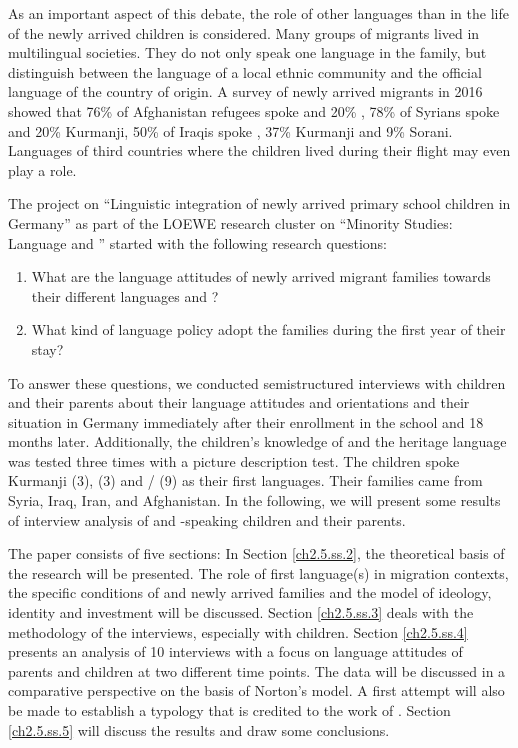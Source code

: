 \documentclass[output=paper,colorlinks,citecolor=brown]{langscibook}
\begin{document}
\largerpage
As an important aspect of this debate, the role of other languages than  in the life of the newly arrived children is considered. Many groups of migrants lived in multilingual societies. They do not only speak one language in the family, but distinguish between the language of a local ethnic community and the official language of the country of origin. A survey of newly arrived migrants in 2016 \citep{bruecker_rother_schupp2016} showed that 76\% of Afghanistan refugees spoke  and 20\% , 78\% of Syrians spoke  and 20\% Kurmanji, 50\% of Iraqis spoke , 37\% Kurmanji and 9\% Sorani. Languages of third countries where the children lived during their flight may even play a role.

The project on ``Linguistic integration of newly arrived primary school children in Germany'' as part of the LOEWE research cluster on ``Minority Studies: Language and '' started with the following research questions: 

\begin{enumerate}
    \item What are the language attitudes of newly arrived migrant families towards their different languages and ? 
    \item What kind of language policy adopt the families during the first year of their stay? 
\end{enumerate}

To answer these questions, we conducted semistructured interviews with children and their parents about their language attitudes and orientations and their situation in Germany immediately after their enrollment in the school and 18 months later. Additionally, the children's knowledge of  and the heritage language was tested three times with a picture description test. The children spoke Kurmanji  (3),  (3) and / (9) as their first languages. Their families came from Syria, Iraq, Iran, and Afghanistan. In the following, we will present some results of interview analysis of  and -speaking children and their parents.

The paper consists of five sections: In Section \ref{ch2.5.ss.2}, the theoretical basis of the research will be presented. The role of first language(s) in migration contexts, the specific conditions of  and newly arrived families and the model of ideology, identity and investment will be discussed. Section \ref{ch2.5.ss.3} deals with the methodology of the interviews, especially with children. Section \ref{ch2.5.ss.4} presents an analysis of 10 interviews with a focus on language attitudes of parents and children at two different time points. The data will be discussed in a comparative perspective on the basis of Norton's model. A first attempt will also be made to establish a typology that is credited to the work of \citet{brizic2021}. Section \ref{ch2.5.ss.5} will discuss the results and draw some conclusions.
\end{document}
